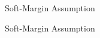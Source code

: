 \begin{frame}[fragile]{Soft-Margin Assumption}
\end{frame}

\begin{frame}[fragile]{Soft-Margin Assumption}
\end{frame}